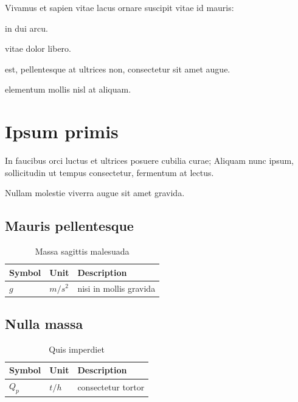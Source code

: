 Vivamus et sapien vitae lacus ornare suscipit vitae id mauris:

\begin{description}[labelwidth=\widthof{\bfseries suspendisse},align=left]
\item[Vivamus]{in dui arcu.}
\item[Morbi]{vitae dolor libero.}
\item[Tellus]{est, pellentesque at ultrices non, consectetur sit amet augue.}
\item[Suspendisse]{elementum mollis nisl at aliquam.}
\end{description}

\newpage 
\section{Ipsum primis}

In faucibus orci luctus et ultrices posuere cubilia curae; Aliquam nunc ipsum,
sollicitudin ut tempus consectetur, fermentum at lectus.

Nullam molestie viverra augue sit amet gravida.

\newenvironment{nomenclature}[1]
{
\begin{table}[hbt]
\caption{#1}
\begin{center}
\begin{tabular}{|l|l|l|}
\hline
\textbf{Symbol} & \textbf{Unit} & \textbf{Description}\\
\hline
}
{
\\\hline
\end{tabular}
\end{center}
\end{table}
}

\subsection{Mauris pellentesque}

\begin{nomenclature}{Massa sagittis malesuada}
$g$     & $m/s^{2}$ & nisi in mollis gravida
\end{nomenclature}

\subsection{Nulla massa}

\begin{nomenclature}{Quis imperdiet}
$Q_{p}$         & $t/h$             & consectetur tortor
\end{nomenclature}

